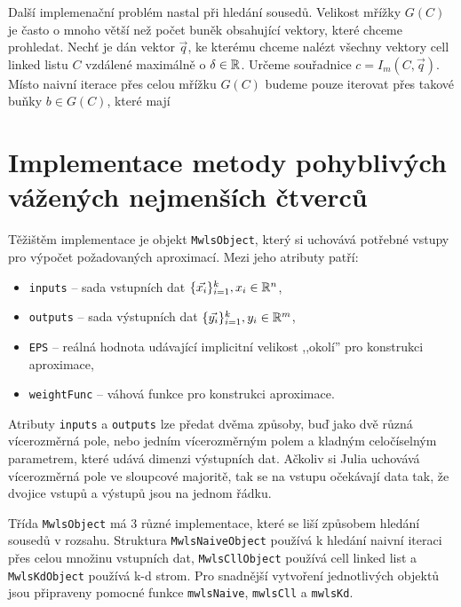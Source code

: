 Další implemenační problém nastal při hledání sousedů. Velikost mřížky $G(C)$ je často o mnoho větší než počet buněk obsahující vektory, které chceme prohledat. Nechť je dán vektor $\vec{q}$, ke kterému chceme nalézt všechny vektory cell linked listu $C$ vzdálené maximálně o $\delta \in \mathbb{R}$. Určeme souřadnice $c = I_m(C, \vec{q})$. Místo naivní iterace přes celou mřížku $G(C)$ budeme pouze iterovat přes takové buňky $b \in G(C)$, které mají 

\section{Implementace metody pohyblivých vážených nejmenších čtverců}

Těžištěm implementace je objekt \texttt{MwlsObject}, který si uchovává potřebné vstupy pro výpočet požadovaných aproximací. Mezi jeho atributy patří:
\begin{itemize}
  \item \texttt{inputs} -- sada vstupních dat $\{\vec{x_i}\}_{i=1}^k, x_i \in \mathbb{R}^n$,
  \item \texttt{outputs} -- sada výstupních dat $\{\vec{y_i}\}_{i=1}^k, y_i \in \mathbb{R}^m$,
  \item \texttt{EPS} -- reálná hodnota udávající implicitní velikost ,,okolí'' pro konstrukci aproximace,
  \item \texttt{weightFunc} -- váhová funkce pro konstrukci aproximace.
\end{itemize}
Atributy \texttt{inputs} a \texttt{outputs} lze předat dvěma způsoby, buď jako dvě různá vícerozměrná pole, nebo jedním vícerozměrným polem a kladným celočíselným parametrem, které udává dimenzi výstupních dat. Ačkoliv si Julia uchovává vícerozměrná pole ve sloupcové majoritě, tak se na vstupu očekávají data tak, že dvojice vstupů a výstupů jsou na jednom řádku.

Třída \texttt{MwlsObject} má 3 různé implementace, které se liší způsobem hledání sousedů v rozsahu. Struktura \texttt{MwlsNaiveObject} používá k hledání naivní iteraci přes celou množinu vstupních dat, \texttt{MwlsCllObject} používá cell linked list a \texttt{MwlsKdObject} používá k-d strom. Pro snadnější vytvoření jednotlivých objektů jsou připraveny pomocné funkce \texttt{mwlsNaive}, \texttt{mwlsCll} a \texttt{mwlsKd}.


